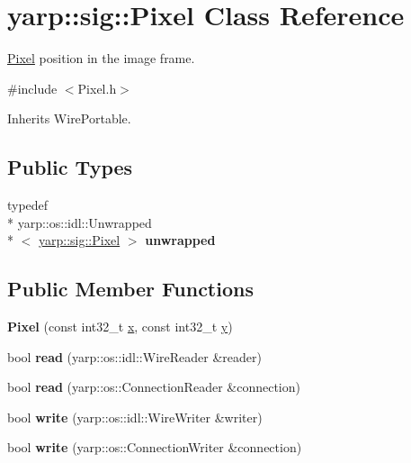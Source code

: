 \section{yarp\+:\+:sig\+:\+:Pixel Class Reference}
\label{classyarp_1_1sig_1_1Pixel}


\hyperlink{classyarp_1_1sig_1_1Pixel}{Pixel} position in the image frame.  




{\ttfamily \#include $<$Pixel.\+h$>$}



Inherits Wire\+Portable.

\subsection*{Public Types}
\begin{DoxyCompactItemize}
\item 
typedef \\*
yarp\+::os\+::idl\+::\+Unwrapped\\*
$<$ \hyperlink{classyarp_1_1sig_1_1Pixel}{yarp\+::sig\+::\+Pixel} $>$ {\bfseries unwrapped}\label{classyarp_1_1sig_1_1Pixel_a2e2e4781602885250c9284572e128ec5}

\end{DoxyCompactItemize}
\subsection*{Public Member Functions}
\begin{DoxyCompactItemize}
\item 
{\bfseries Pixel} (const int32\+\_\+t \hyperlink{classyarp_1_1sig_1_1Pixel_a4d6a5b0c693035c4012aa15e8f8b4b64}{x}, const int32\+\_\+t \hyperlink{classyarp_1_1sig_1_1Pixel_a2ac1d9f1602f323fb9ca9fe62541aeb2}{y})\label{classyarp_1_1sig_1_1Pixel_a892add3151640573f74252f120e60d52}

\item 
bool {\bfseries read} (yarp\+::os\+::idl\+::\+Wire\+Reader \&reader)\label{classyarp_1_1sig_1_1Pixel_af3d1087eb2cc26f64466621bd448fb41}

\item 
bool {\bfseries read} (yarp\+::os\+::\+Connection\+Reader \&connection)\label{classyarp_1_1sig_1_1Pixel_afff7ebed51d888d01dc75cf6093d1d3e}

\item 
bool {\bfseries write} (yarp\+::os\+::idl\+::\+Wire\+Writer \&writer)\label{classyarp_1_1sig_1_1Pixel_a2aa54d8b318270d615aacb046512eb20}

\item 
bool {\bfseries write} (yarp\+::os\+::\+Connection\+Writer \&connection)\label{classyarp_1_1sig_1_1Pixel_a15f5eca483f6ee5a90bf2de68ec75c8e}

\end{DoxyCompactItemize}
